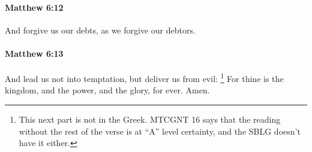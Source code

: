		\paragraph{Matthew 6:12} %
			\label{MATTHEW-6-12}

			And forgive us our debts, as we forgive our debtors.

			\begin{framed}
			\scriptsize
				\begin{compactdesc}
					\item[SBLG] 
				\end{compactdesc}
			\end{framed}

		\paragraph{Matthew 6:13} %
			\label{MATTHEW-6-13}

			And lead us not into temptation, but deliver us from evil:
				\footnote{%
					This next part is not in the Greek. MTCGNT 16 says that the reading without the rest of the verse is at ``A'' level certainty, and the SBLG doesn't have it either.
					}%
			For thine is the kingdom, and the power, and the glory, for ever. Amen.

